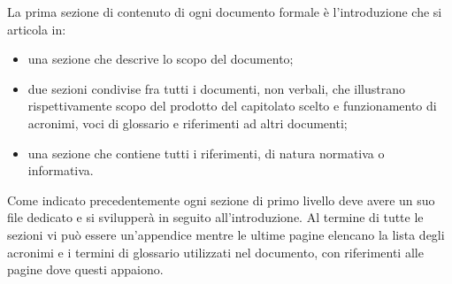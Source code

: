             La prima sezione di contenuto di ogni documento formale è l'introduzione che si articola in:
            \begin{itemize}
                \item una sezione che descrive lo scopo del documento;
                \item due sezioni condivise fra tutti i documenti, non verbali, che illustrano rispettivamente scopo del prodotto del capitolato scelto e funzionamento di acronimi, voci di glossario e riferimenti ad altri documenti;
                \item una sezione che contiene tutti i riferimenti, di natura normativa o informativa.
            \end{itemize}
            Come indicato precedentemente ogni sezione di primo livello deve avere un suo file dedicato e si svilupperà in seguito all'introduzione. Al termine di tutte le sezioni vi può essere un'appendice mentre le ultime pagine elencano la lista degli acronimi e i termini di glossario utilizzati nel documento, con riferimenti alle pagine dove questi appaiono.

